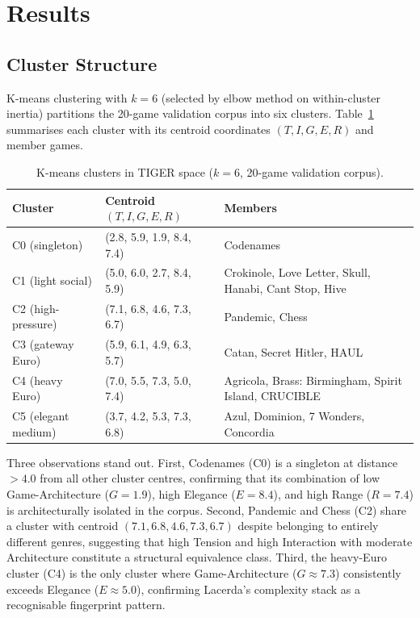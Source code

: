 \section{Results}
\label{sec:results}

\subsection{Cluster Structure}

K-means clustering with $k = 6$ (selected by elbow method on within-cluster inertia)
partitions the 20-game validation corpus into six clusters. Table~\ref{tab:clusters}
summarises each cluster with its centroid coordinates $(T, I, G, E, R)$ and member games.

\begin{table}[h]
\centering
\caption{K-means clusters in TIGER space ($k=6$, 20-game validation corpus).}
\label{tab:clusters}
\begin{tabular}{llp{5.5cm}}
\hline
\textbf{Cluster} & \textbf{Centroid $(T,I,G,E,R)$} & \textbf{Members} \\
\hline
C0 (singleton) & (2.8, 5.9, 1.9, 8.4, 7.4) & Codenames \\
C1 (light social) & (5.0, 6.0, 2.7, 8.4, 5.9) & Crokinole, Love Letter, Skull, Hanabi, Cant Stop, Hive \\
C2 (high-pressure) & (7.1, 6.8, 4.6, 7.3, 6.7) & Pandemic, Chess \\
C3 (gateway Euro) & (5.9, 6.1, 4.9, 6.3, 5.7) & Catan, Secret Hitler, HAUL \\
C4 (heavy Euro) & (7.0, 5.5, 7.3, 5.0, 7.4) & Agricola, Brass: Birmingham, Spirit Island, CRUCIBLE \\
C5 (elegant medium) & (3.7, 4.2, 5.3, 7.3, 6.8) & Azul, Dominion, 7 Wonders, Concordia \\
\hline
\end{tabular}
\end{table}

Three observations stand out. First, Codenames (C0) is a singleton at distance $> 4.0$
from all other cluster centres, confirming that its combination of low Game-Architecture
($G = 1.9$), high Elegance ($E = 8.4$), and high Range ($R = 7.4$) is architecturally
isolated in the corpus. Second, Pandemic and Chess (C2) share a cluster with centroid
$(7.1, 6.8, 4.6, 7.3, 6.7)$ despite belonging to entirely different genres, suggesting
that high Tension and high Interaction with moderate Architecture constitute a structural
equivalence class. Third, the heavy-Euro cluster (C4) is the only cluster where
Game-Architecture ($G \approx 7.3$) consistently exceeds Elegance ($E \approx 5.0$),
confirming Lacerda's complexity stack as a recognisable fingerprint pattern.

